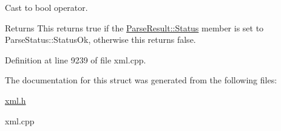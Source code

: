 Cast to bool operator. 

\begin{DoxyReturn}{Returns}
This returns true if the \hyperlink{structphys_1_1xml_1_1ParseResult_a1bf9dfeebdb07656723bbaf18ab612b5}{ParseResult::Status} member is set to ParseStatus::StatusOk, otherwise this returns false. 
\end{DoxyReturn}


Definition at line 9239 of file xml.cpp.



The documentation for this struct was generated from the following files:\begin{DoxyCompactItemize}
\item 
\hyperlink{xml_8h}{xml.h}\item 
xml.cpp\end{DoxyCompactItemize}
